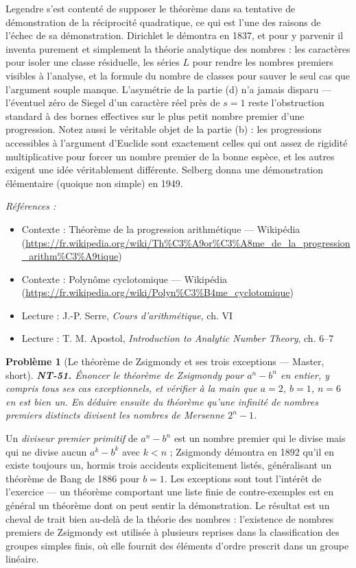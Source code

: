 \documentclass[11pt]{article}
\newtheorem{problem}{Problème}
\newenvironment{refs}{\par\small\noindent\emph{Références :}\begin{itemize}\setlength\itemsep{0pt}}{\end{itemize}\normalsize}
\begin{document}
\noindent Legendre s'est contenté de supposer le théorème dans sa tentative de démonstration
de la réciprocité quadratique, ce qui est l'une des raisons de l'échec de sa démonstration. Dirichlet
le démontra en 1837, et pour y parvenir il inventa purement et simplement la théorie analytique des
nombres : les caractères pour isoler une classe résiduelle, les séries $ L $ pour rendre les
nombres premiers visibles à l'analyse, et la formule du nombre de classes pour sauver le seul cas que
l'argument souple manque. L'asymétrie de la partie (d) n'a jamais disparu --- l'éventuel \og{} zéro de
Siegel \fg{} d'un caractère réel près de $ s = 1 $ reste l'obstruction standard à des bornes effectives
sur le plus petit nombre premier d'une progression. Notez aussi le véritable objet de la partie (b) :
les progressions accessibles à l'argument d'Euclide sont exactement celles qui ont assez de rigidité
multiplicative pour forcer un nombre premier de la bonne espèce, et les autres exigent une idée
véritablement différente. Selberg donna une démonstration élémentaire (quoique non simple) en
1949.

\begin{refs}
\item Contexte : Théorème de la progression arithmétique --- Wikipédia (\url{https://fr.wikipedia.org/wiki/Th%C3%A9or%C3%A8me_de_la_progression_arithm%C3%A9tique})
\item Contexte : Polynôme cyclotomique --- Wikipédia (\url{https://fr.wikipedia.org/wiki/Polyn%C3%B4me_cyclotomique})
\item Lecture : J.-P. Serre, \textit{Cours d'arithmétique}, ch. VI
\item Lecture : T. M. Apostol, \textit{Introduction to Analytic Number Theory}, ch. 6--7
\end{refs}

\bigskip

\begin{problem}[{Le théorème de Zsigmondy et ses trois exceptions --- Master, short}]
\textbf{NT-51.} Énoncer le théorème de Zsigmondy pour $ a^n - b^n $ en
entier, y compris tous ses cas exceptionnels, et vérifier à la main que $ a = 2 $, $ b = 1 $,
$ n = 6 $ en est bien un. En déduire ensuite du théorème qu'une infinité de nombres premiers
distincts divisent les nombres de Mersenne $ 2^n - 1 $.
\end{problem}

\noindent Un \textit{diviseur premier primitif} de $ a^n - b^n $ est un nombre premier qui
le divise mais qui ne divise aucun $ a^k - b^k $ avec $ k < n $ ; Zsigmondy démontra en 1892
qu'il en existe toujours un, hormis trois accidents explicitement listés, généralisant un théorème de
Bang de 1886 pour $ b = 1 $. Les exceptions sont tout l'intérêt de l'exercice --- un théorème
comportant une liste finie de contre-exemples est en général un théorème dont on peut sentir la
démonstration. Le résultat est un cheval de trait bien au-delà de la théorie des nombres :
l'existence de nombres premiers de Zsigmondy est utilisée à plusieurs reprises dans la classification
des groupes simples finis, où elle fournit des éléments d'ordre prescrit dans un groupe linéaire.
\end{document}
